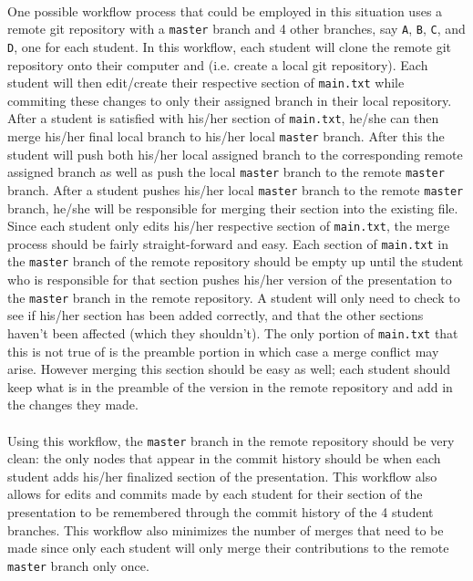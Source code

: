 \documentclass[12pt]{article}
\begin{document}
\paragraph{} One possible workflow process that could be employed in this situation uses a remote git repository with a \texttt{master} branch and 4 other branches, say \texttt{A}, \texttt{B}, \texttt{C}, and \texttt{D}, one for each student. In this workflow, each student will clone the remote git repository onto their computer and (i.e. create a local git repository). Each student will then edit/create their respective section of \texttt{main.txt} while commiting these changes to only their assigned branch in their local repository. After a student is satisfied with his/her section of \texttt{main.txt}, he/she can then merge his/her final local branch to his/her local \texttt{master} branch. After this the student will push both his/her local assigned branch to the corresponding remote assigned branch as well as push the local \texttt{master} branch to the remote \texttt{master} branch. After a student pushes his/her local \texttt{master} branch to the remote \texttt{master} branch, he/she will be responsible for merging their section into the existing file. Since each student only edits his/her respective section of \texttt{main.txt}, the merge process should be fairly straight-forward and easy. Each section of \texttt{main.txt} in the \texttt{master} branch of the remote repository should be empty up until the student who is responsible for that section pushes his/her version of the presentation to the \texttt{master} branch in the remote repository. A student will only need to check to see if his/her section has been added correctly, and that the other sections haven't been affected (which they shouldn't). The only portion of \texttt{main.txt} that this is not true of is the preamble portion in which case a merge conflict may arise. However merging this section should be easy as well; each student should keep what is in the preamble of the version in the remote repository and add in the changes they made. 

\paragraph{}Using this workflow, the \texttt{master} branch in the remote repository should be very clean: the only nodes that appear in the commit history should be when each student adds his/her finalized section of the presentation. This workflow also allows for edits and commits made by each student for their section of the presentation to be remembered through the commit history of the 4 student branches. This workflow also minimizes the number of merges that need to be made since only each student will only merge their contributions to the remote \texttt{master} branch only once.
\end{document}
